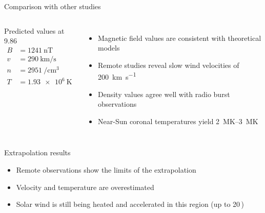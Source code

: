 \begin{frame}[plain,c]{Comparison with other studies}{}
	\begin{columns}[c]
		
		\begin{block}{\centering Predicted values at 9.86\,\Rs{}}
			\begin{align*}
				B &= \SI{1241}{\nano\tesla}\\
				v &= \SI{290}{\km\per\s}\\
				n &= \SI{2951}{\per\cm\cubed}\\
				T &= \SI{1.93e6}{\kelvin}
			\end{align*}
		\end{block}


		\begin{itemize}[<+->]
			\item Magnetic field values are consistent with theoretical models \citep{Parker1958,Banaszkiewicz1998}
			\item Remote studies reveal slow wind velocities of \SI{200}{\km\per\s} \citep{Sheeley1997,Wang2000}
			\item Density values agree well with radio burst observations \citep{Leblanc1998}
			\item Near-Sun coronal temperatures yield \SIrange{2}{3}{\mega\kelvin} \citep{Billings1959,Liebenberg1975}
		\end{itemize}
	\end{columns}
	
	\vspace{5mm}
	
	\begin{columns}[c]
	\column<+->{\textwidth}
	
		\begin{block}{Extrapolation results \citep{Venzmer2018}}
			\begin{itemize}
				\item Remote observations show the limits of the extrapolation
				\item Velocity and temperature are overestimated
				\item Solar wind is still being heated and accelerated in this region (up to 20\,\Rs{})
			\end{itemize}
		\end{block}
	
	\end{columns}
\end{frame}


